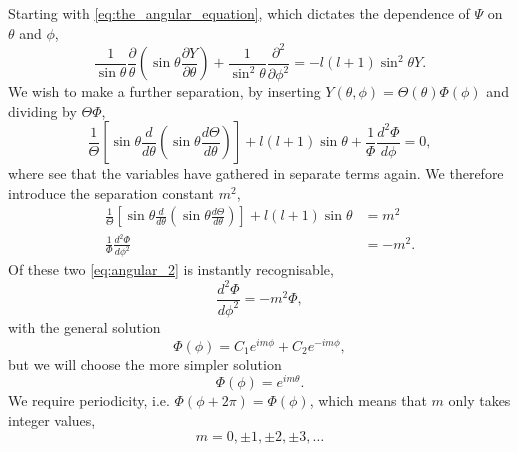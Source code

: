 Starting with \autoref{eq:the_angular_equation}, which dictates the dependence of
$\Psi$ on $\theta$ and $\phi$,
\begin{equation}
    \frac{1}{\sin\theta}\frac{\partial}{\theta} 
        \left(\sin\theta\frac{\partial Y}{\partial \theta} \right)
    +
    \frac{1}{\sin^2\theta} \frac{\partial^2}{\partial\phi^2}
    =
    -l(l + 1)\sin^2\theta Y.
\end{equation}
We wish to make a further separation, by inserting
$Y(\theta, \phi) = \Theta(\theta)\Phi(\phi)$ and dividing by $\Theta\Phi$,
\begin{equation}
    \frac{1}{\Theta}
    \left[
        \sin\theta \frac{d}{d\theta}
            \left(\sin\theta \frac{d\Theta}{d\theta} \right)
    \right]
    + l(l + 1) \sin\theta 
    +
    \frac{1}{\Phi} \frac{d^2\Phi}{d\phi} = 0,
\end{equation}
where see that the variables have gathered in separate terms again. We therefore 
introduce the separation constant $m^2$,
\begin{align}
    \label{eq:angular_1}
    \frac{1}{\Theta}
    \left[
        \sin\theta \frac{d}{d\theta}
            \left(\sin\theta \frac{d\Theta}{d\theta} \right)
    \right]
    + l(l + 1)\sin\theta &= m^2 \\
    \label{eq:angular_2}
    \frac{1}{\Phi}\frac{d^2\Phi}{d\phi^2} &= -m^2.
\end{align}
Of these two \autoref{eq:angular_2} is instantly recognisable,
\begin{equation}
    \frac{d^2\Phi}{d\phi^2} = -m^2\Phi,
\end{equation}
with the general solution
\begin{equation}
    \Phi(\phi) = C_1e^{im\phi} + C_2 e^{-im\phi},
\end{equation}
but we will choose the more simpler solution 
\begin{equation}
    \Phi(\phi) = e^{im\theta}.
\end{equation}
We require periodicity, i.e. $\Phi(\phi + 2\pi) = \Phi(\phi)$, which means that 
$m$ only takes integer values,
\begin{equation*}
    m = 0, \pm 1, \pm 2, \pm 3, \dots
\end{equation*}

